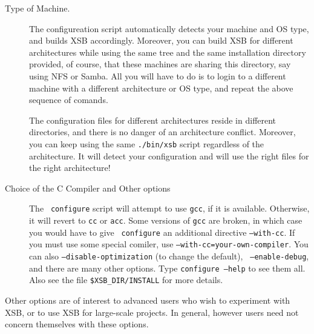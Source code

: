 \begin{description}
\item[Type of Machine.]  The configureation script automatically detects
  your machine and OS type, and builds XSB accordingly. Moreover, you can
  build XSB for different architectures while using the same tree and the
  same installation directory provided, of course, that these machines are
  sharing this directory, say using NFS or Samba. All you will have to do
  is to login to a different machine with a different architecture or OS
  type, and repeat the above sequence of comands.
  
  The configuration files for different architectures reside in different
  directories, and there is no danger of an architecture conflict.
  Moreover, you can keep using the same {\tt ./bin/xsb} script regardless
  of the architecture. It will detect your configuration and will use the
  right files for the right architecture! 
  
\item[Choice of the C Compiler and Other options] \label{cc} The {\tt
    configure} script will attempt to use {\tt gcc}, if it is available.
  Otherwise, it will revert to {\tt cc} or {\tt acc}.  Some versions of
  {\tt gcc} are broken, in which case you would have to give {\tt
    configure} an additional directive {\tt --with-cc}. If you must use
  some special comiler, use {\tt --with-cc=your-own-compiler}.  You can
  also {\tt --disable-optimization} (to change the default), {\tt
    --enable-debug}, and there are many other options.  Type {\tt configure
    --help} to see them all. Also see the file \verb'$XSB_DIR/INSTALL' for
  more details.
\end{description}

Other options are of interest to advanced users who wish to experiment
with XSB, or to use XSB for large-scale projects.  In general, however
users need not concern themselves with these options.

